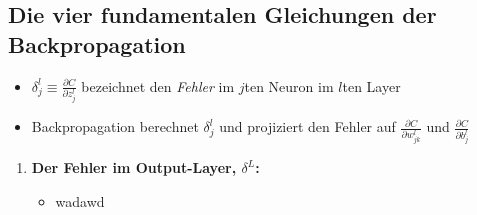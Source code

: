 \subsection{Die vier fundamentalen Gleichungen der Backpropagation}

\begin{itemize}
  \item $\delta_j^l \equiv \frac{\partial C}{\partial z_j^l}$ bezeichnet den \emph{Fehler} im $j$ten Neuron im $l$ten Layer
  \item Backpropagation berechnet $\delta_j^l$ und projiziert den Fehler auf $\frac{\partial C}{\partial w_{jk}^l}$ und $\frac{\partial C}{\partial b_j^l}$
\end{itemize}

\begin{enumerate}
  \item \textbf{Der Fehler im Output-Layer, $\delta^L$:}
  \begin{itemize}
      \item wadawd
  \end{itemize}
\end{enumerate}
